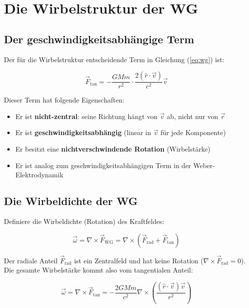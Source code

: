 \documentclass[12pt,a4paper]{article}
\begin{document}
\section{Die Wirbelstruktur der WG}

\subsection{Der geschwindigkeitsabhängige Term}

Der für die Wirbelstruktur entscheidende Term in Gleichung (\ref{eq:wg}) ist:

\begin{equation}
\vec{F}_{\text{tan}} = -\frac{GMm}{r^2} \cdot \frac{2(\hat{r}\cdot\vec{v})}{c^2}\vec{v}
\label{eq:tan}
\end{equation}

Dieser Term hat folgende Eigenschaften:
\begin{itemize}
    \item Er ist \textbf{nicht-zentral}: seine Richtung hängt von \(\vec{v}\) ab, nicht nur von \(\vec{r}\)
    \item Er ist \textbf{geschwindigkeitsabhängig} (linear in \(\vec{v}\) für jede Komponente)
    \item Er besitzt eine \textbf{nichtverschwindende Rotation} (Wirbelstärke)
    \item Er ist analog zum geschwindigkeitsabhängigen Term in der Weber-Elektrodynamik \cite{weber1846}
\end{itemize}

\subsection{Die Wirbeldichte der WG}

Definiere die Wirbeldichte (Rotation) des Kraftfeldes:

\begin{equation}
\vec{\omega} = \nabla \times \vec{F}_{\text{WG}} = \nabla \times (\vec{F}_{\text{rad}} + \vec{F}_{\text{tan}})
\end{equation}

Der radiale Anteil \(\vec{F}_{\text{rad}}\) ist ein Zentralfeld und hat keine Rotation (\(\nabla \times \vec{F}_{\text{rad}} = 0\)). Die gesamte Wirbelstärke kommt also vom tangentialen Anteil:

\begin{equation}
\vec{\omega} = \nabla \times \vec{F}_{\text{tan}} = -\frac{2GMm}{c^2} \nabla \times \left( \frac{(\hat{r}\cdot\vec{v})\vec{v}}{r^2} \right)
\label{eq:vorticity}
\end{equation}
\end{document}
